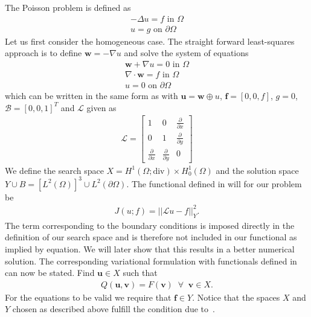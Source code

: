 The Poisson problem is defined as 
\begin{align}
	-\Delta u = f \text{ in } \Omega \\
	u = g \text{ on } \partial \Omega
	\label{eq:Poisson}
\end{align}
Let us first consider the homogeneous case. The straight forward least-squares approach is to define $\mathbf{w} = -\nabla u$ and solve the system of equations 
\begin{align}
	\mathbf{w} + \nabla u = 0 \text{ in } \Omega \\
	\nabla \cdot \mathbf{w} = f \text{ in } \Omega \\
	u = 0 \text{ on } \partial \Omega
	\label{eq:PoissonSystem}
\end{align}
which can be written in the same form as with $ \mathbf{u} = \mathbf{w} \oplus u $, $\mathbf{f} = [0,0,f]$, $g=0$, $\mathcal{B} = [0,0,1]^T $ and $\mathcal{L}$ given as 
\begin{align}
	\mathcal{L} =
	\begin{bmatrix}
		1 & 0 & \frac{\partial} {\partial x}  \\
		0 & 1 & \frac{\partial} {\partial y}  \\
    \frac{\partial} {\partial x} & \frac{\partial} {\partial y} & 0 
	\end{bmatrix}
	\label{eq:Amatrix}
\end{align}
We define the search space $X =  H^1(\Omega;\text{div}) \times H_0^1(\Omega)$ and the solution space $Y \cup  B  = [L^2(\Omega)]^3\cup L^2(\partial \Omega) $. The functional defined in will for our problem be 
\begin{align}
	J(u;f) = ||\mathcal{L}u-f||^2_Y.
	\label{eq:lsFunctionalPoisson}
\end{align}
The term corresponding to the boundary conditions is imposed directly in the definition of our search space and is therefore not included in our functional as implied by equation. We will later show that this results in a better numerical solution. The corresponding variational formulation with functionals defined in can now be stated. Find $ \mathbf{u} \in X $ such that
\begin{align}
	Q(\mathbf{u},\mathbf{v}) = F(\mathbf{v}) \;\; \forall \;\; \mathbf{v} \in X.
	\label{eq:VariationalFormulationPoisson}
\end{align}
For the equations to be valid we require that $\mathbf{f} \in Y$.
Notice that the spaces $X$ and $Y$ chosen as described above fulfill the condition due to~\cite{Bochev}. 
%
